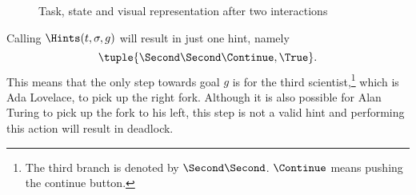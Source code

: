 \begin{figure}[t]
\begin{minipage}[r]{0.3\textwidth}
  \end{minipage}
  \caption{Task, state and visual representation after two interactions}
  \label{fig:dining-middle}
\end{figure}

Calling $\Hints(t,\sigma,g)$ will result in just one hint, namely
\begin{equation*}
  \tuple{\Second\Second\Continue,\True}.
\end{equation*}
This means that the only step towards goal $g$ is for the third scientist,\footnote{
  The third branch is denoted by $\Second\Second$.
  $\Continue$ means pushing the continue button.
}
which is Ada Lovelace, to pick up the right fork.
Although it is also possible for Alan Turing to pick up the fork to his left,
this step is not a valid hint and performing this action will result in deadlock.
